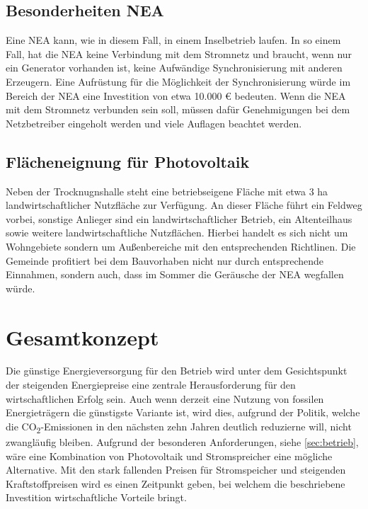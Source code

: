\documentclass[11pt]{scrartcl}
\begin{document}
\subsection{Besonderheiten NEA}
\label{subsec:NEA}
Eine \ac{NEA} kann, wie in diesem Fall, in einem Inselbetrieb laufen.
In so einem Fall, hat die \ac{NEA} keine Verbindung mit dem Stromnetz und braucht, wenn nur ein Generator vorhanden ist, keine Aufwändige Synchronisierung mit anderen Erzeugern.
Eine Aufrüstung für die Möglichkeit der Synchronisierung würde im Bereich der \ac{NEA} eine Investition von etwa 10.000 € bedeuten.
Wenn die \ac{NEA} mit dem Stromnetz verbunden sein soll, müssen dafür Genehmigungen bei dem Netzbetreiber eingeholt werden und viele Auflagen beachtet werden.


\subsection{Flächeneignung für Photovoltaik}
Neben der Trocknugnshalle steht eine betriebseigene Fläche mit etwa 3 ha landwirtschaftlicher Nutzfläche zur Verfügung.
An dieser Fläche führt ein Feldweg vorbei, sonstige Anlieger sind ein landwirtschaftlicher Betrieb, ein Altenteilhaus sowie weitere landwirtschaftliche Nutzflächen.
Hierbei handelt es sich nicht um Wohngebiete sondern um Außenbereiche mit den entsprechenden Richtlinen.
Die Gemeinde profitiert bei dem Bauvorhaben nicht nur durch entsprechende Einnahmen, sondern auch, dass im Sommer die Geräusche der \ac{NEA} wegfallen würde.



\section{Gesamtkonzept}
Die günstige Energieversorgung für den Betrieb wird unter dem Gesichtspunkt der steigenden Energiepreise eine zentrale Herausforderung für den wirtschaftlichen Erfolg sein.
Auch wenn derzeit eine Nutzung von fossilen Energieträgern die günstigste Variante ist, wird dies, aufgrund der Politik, welche die CO\textsubscript{2}-Emissionen in den nächsten zehn Jahren deutlich reduzierne will, nicht zwangläufig bleiben.
Aufgrund der besonderen Anforderungen, siehe \cref{sec:betrieb}, wäre eine Kombination von Photovoltaik und Stromspreicher eine mögliche Alternative.
Mit den stark fallenden Preisen für Stromspeicher  und steigenden Kraftstoffpreisen wird es einen Zeitpunkt geben, bei welchem die beschriebene Investition wirtschaftliche Vorteile bringt.
\end{document}

